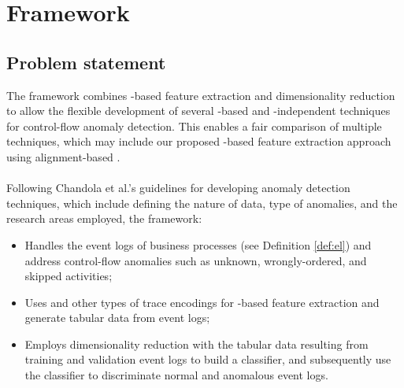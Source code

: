 \section{Framework}
\label{sec:framework}
\subsection{Problem statement}
The framework combines -based feature extraction and dimensionality reduction to allow the flexible development of several -based and -independent techniques for control-flow anomaly detection. This enables a fair comparison of multiple techniques, which may include our proposed -based feature extraction approach using alignment-based . 

\paragraph{}
Following Chandola et al.'s guidelines \cite{chandola2009ad} for developing anomaly detection techniques, which include defining the nature of data, type of anomalies, and the research areas employed, the framework:
\begin{itemize}
    \item Handles the event logs of business processes (see Definition \ref{def:el}) and address control-flow anomalies such as unknown, wrongly-ordered, and skipped activities;
    \item Uses  and other types of trace encodings for -based feature extraction and generate tabular data from event logs;
    \item Employs dimensionality reduction with the tabular data resulting from training and validation event logs to build a classifier, and subsequently use the classifier to discriminate normal and anomalous event logs.
\end{itemize}

